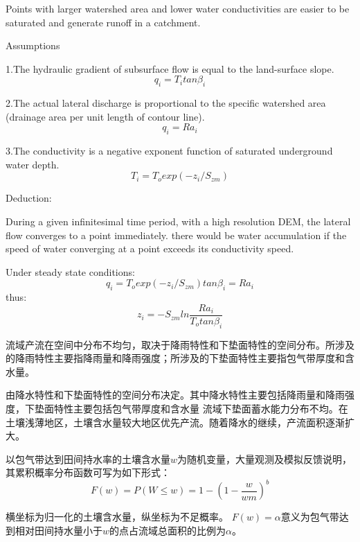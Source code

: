 
Points with larger watershed area and lower water conductivities are easier to be saturated and generate runoff in a catchment.

Assumptions

1.The hydraulic gradient of subsurface flow is equal to the land-surface slope.
\begin{equation}
q_i=T_itan\beta_i
\end{equation}

2.The actual lateral discharge is proportional to the specific watershed area (drainage area per unit length of
contour line).
\begin{equation}
q_i=Ra_i
\end{equation}

3.The conductivity is a negative exponent function of saturated underground water depth.
\begin{equation}
T_i=T_oexp(-z_i/S_{zm})
\end{equation}

Deduction:

During a given infinitesimal time period, with a high resolution DEM, the lateral flow converges to a point immediately. 
there would be water accumulation if the speed of water converging at a point exceeds its conductivity speed.

Under steady state conditions:
\begin{equation}
q_i=T_oexp(-z_i/S_{zm})tan\beta_i=Ra_i
\end{equation}
thus:
\begin{equation}
z_i=-S_{zm}ln\frac{Ra_i}{T_otan\beta_i}
\end{equation}


流域产流在空间中分布不均匀，取决于降雨特性和下垫面特性的空间分布\cite{ruixiaofang}。所涉及的降雨特性主要指降雨量和降雨强度；所涉及的下垫面特性主要指包气带厚度和含水量。


由降水特性和下垫面特性的空间分布决定。其中降水特性主要包括降雨量和降雨强度，下垫面特性主要包括包气带厚度和含水量
流域下垫面蓄水能力分布不均。在土壤浅薄地区，土壤含水量较大地区优先产流。随着降水的继续，产流面积逐渐扩大。

以包气带达到田间持水率的土壤含水量$w$为随机变量，大量观测及模拟反馈说明，其累积概率分布函数可写为如下形式：
\begin{equation}
F(w)=P(W \leq w)=1-(1-\frac{w}{wm})^b
\end{equation} 



横坐标为归一化的土壤含水量，纵坐标为不足概率。
$F(w)=\alpha  $意义为包气带达到相对田间持水量小于$w$的点占流域总面积的比例为$\alpha $。
 

